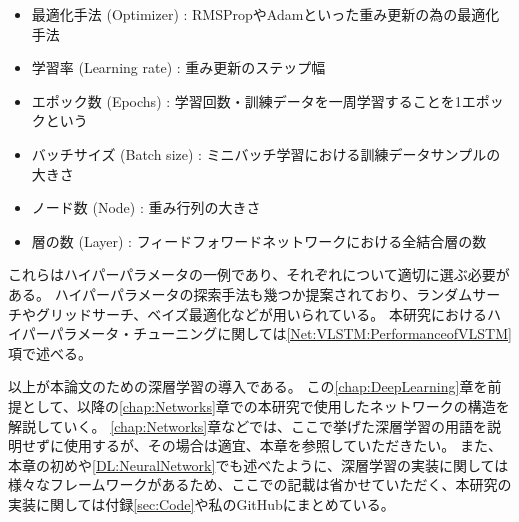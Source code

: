 \begin{itemize}
  \item 最適化手法 (Optimizer) : RMSPropやAdamといった重み更新の為の最適化手法
  \item 学習率 (Learning rate) : 重み更新のステップ幅
  \item エポック数 (Epochs) : 学習回数・訓練データを一周学習することを1エポックという
  \item バッチサイズ (Batch size) : ミニバッチ学習における訓練データサンプルの大きさ
  \item ノード数 (Node) : 重み行列の大きさ
  \item 層の数 (Layer) : フィードフォワードネットワークにおける全結合層の数
\end{itemize}

これらはハイパーパラメータの一例であり、それぞれについて適切に選ぶ必要がある。
ハイパーパラメータの探索手法も幾つか提案されており、ランダムサーチやグリッドサーチ、ベイズ最適化などが用いられている。
本研究におけるハイパーパラメータ・チューニングに関しては\ref{Net:VLSTM:PerformanceofVLSTM}項で述べる。

以上が本論文のための深層学習の導入である。
この\ref{chap:DeepLearning}章を前提として、以降の\ref{chap:Networks}章での本研究で使用したネットワークの構造を解説していく。
\ref{chap:Networks}章などでは、ここで挙げた深層学習の用語を説明せずに使用するが、その場合は適宜、本章を参照していただきたい。
また、本章の初めや\ref{DL:NeuralNetwork}でも述べたように、深層学習の実装に関しては様々なフレームワークがあるため、ここでの記載は省かせていただく、本研究の実装に関しては付録\ref{sec:Code}や私のGitHub\cite{GitHubGotoK}にまとめている。










